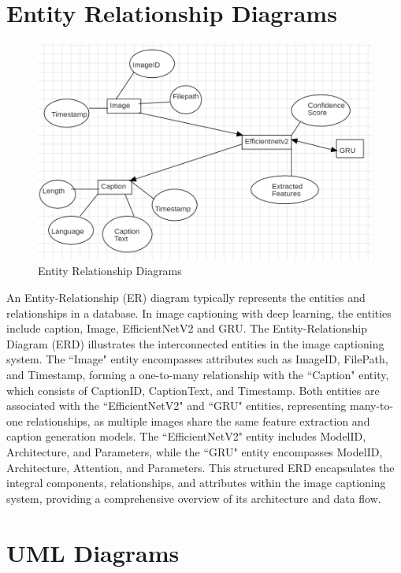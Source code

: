 \documentclass[oneside,a4paper,12pt]{report}
\begin{document}
\section{Entity Relationship Diagrams}   
\begin{figure}[H]
\begin{center}
\includegraphics[width=1.0\linewidth]{er1}
\caption{Entity Relationship Diagrams}
\label{Fig:f3}
\end{center}
\end{figure}
An Entity-Relationship (ER) diagram typically represents the entities and relationships in a database. In image captioning with deep learning, the entities include caption, Image, EfficientNetV2 and GRU.
The Entity-Relationship Diagram (ERD) illustrates the interconnected entities in the image captioning system. The ``Image" entity encompasses attributes such as ImageID, FilePath, and Timestamp, forming a one-to-many relationship with the ``Caption" entity, which consists of CaptionID, CaptionText, and Timestamp. Both entities are associated with the ``EfficientNetV2" and ``GRU" entities, representing many-to-one relationships, as multiple images share the same feature extraction and caption generation models. The ``EfficientNetV2" entity includes ModelID, Architecture, and Parameters, while the ``GRU" entity encompasses ModelID, Architecture, Attention, and Parameters. This structured ERD encapsulates the integral components, relationships, and attributes within the image captioning system, providing a comprehensive overview of its architecture and data flow.
\section{UML Diagrams} 
\end{document}
